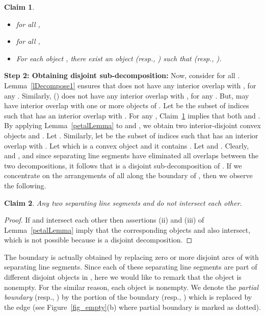 \documentclass[a4paper,11pt]{article}
\newtheorem{claim}{Claim}
\begin{document}
\begin{claim}\label{cD0.3}
\begin{itemize}
\item[(i)]  for all ,
\item[(ii)]  for all ,

\item[(iii)] For each object , there exist an  object   (resp., )
such that  (resp., ).
\end{itemize}
\end{claim}

{\bf Step 2: Obtaining disjoint sub-decomposition:} Now, consider  for all 
. 
Lemma~\ref{lDecompose1} ensures that  does not have any interior overlap with , for any . 
Similarly,  () does not have any  interior overlap with , for any . 
But,  may have interior overlap with one or more objects of .
Let  be the subset of indices  such that  has an interior overlap with . 
For any , Claim~\ref{cD0.3} implies that both  and . 
By applying Lemma~\ref{petalLemma} to  and 
, we obtain two interior-disjoint convex objects  and . Let .
 Similarly, let  be the subset of indices  such that  has an interior overlap with .  Let  which is a convex object and it contains  .
Let   and   . 
Clearly,  and , and since separating line segments  have eliminated all overlaps between the two decompositions, it follows that  is a disjoint sub-decomposition of  .
If we concentrate on  the arrangements of all  along the boundary of 
, then we  observe the following.

\begin{claim}\label{cD1}
Any two separating line segments  and   do not intersect each 
other.
\end{claim}
\begin{proof}
  If   and  intersect each 
other then assertions (ii) and (iii) of Lemma~\ref{petalLemma} imply that the corresponding  objects 
 and   also intersect, which is not possible because  is a disjoint  
decomposition. 
\end{proof}

The boundary  is actually obtained by replacing zero or more disjoint arcs of  with  separating line segments. Since each of these separating line segments are part of different disjoint objects in , here we would like to remark that the object  is nonempty. For the similar reason,  each object  is nonempty.
We denote the {\it partial boundary}  (resp.,  ) by 
the portion 
of the boundary  (resp., 
) which is replaced by the edge   
 (see Figure~\ref{fig_empty}(b) where partial boundary is marked as 
dotted).
\end{document}
